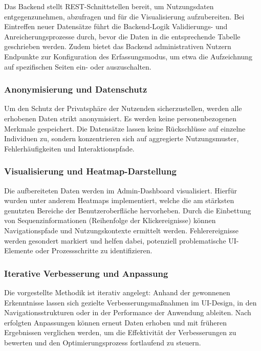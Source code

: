 \documentclass[12pt,oneside]{article}
\begin{document}
Das Backend stellt REST-Schnittstellen bereit, um Nutzungsdaten entgegenzunehmen, abzufragen und für die Visualisierung aufzubereiten. Bei Eintreffen neuer Datensätze führt die Backend-Logik Validierungs- und Anreicherungsprozesse durch, bevor die Daten in die entsprechende Tabelle geschrieben werden. Zudem bietet das Backend administrativen Nutzern Endpunkte zur Konfiguration des Erfassungsmodus, um etwa die Aufzeichnung auf spezifischen Seiten ein- oder auszuschalten.

\subsubsection{Anonymisierung und Datenschutz}

Um den Schutz der Privatsphäre der Nutzenden sicherzustellen, werden alle erhobenen Daten strikt anonymisiert. Es werden keine personenbezogenen Merkmale gespeichert. Die Datensätze lassen keine Rückschlüsse auf einzelne Individuen zu, sondern konzentrieren sich auf aggregierte Nutzungsmuster, Fehlerhäufigkeiten und Interaktionspfade.

\subsubsection{Visualisierung und Heatmap-Darstellung}

Die aufbereiteten Daten werden im Admin-Dashboard visualisiert. Hierfür wurden unter anderem Heatmaps implementiert, welche die am stärksten genutzten Bereiche der Benutzeroberfläche hervorheben. Durch die Einbettung von Sequenzinformationen (Reihenfolge der Klickereignisse) können Navigationspfade und Nutzungskontexte ermittelt werden. Fehlerereignisse werden gesondert markiert und helfen dabei, potenziell problematische UI-Elemente oder Prozessschritte zu identifizieren.

\subsubsection{Iterative Verbesserung und Anpassung}

Die vorgestellte Methodik ist iterativ angelegt: Anhand der gewonnenen Erkenntnisse lassen sich gezielte Verbesserungsmaßnahmen im UI-Design, in den Navigationsstrukturen oder in der Performance der Anwendung ableiten. Nach erfolgten Anpassungen können erneut Daten erhoben und mit früheren Ergebnissen verglichen werden, um die Effektivität der Verbesserungen zu bewerten und den Optimierungsprozess fortlaufend zu steuern.
\end{document}
